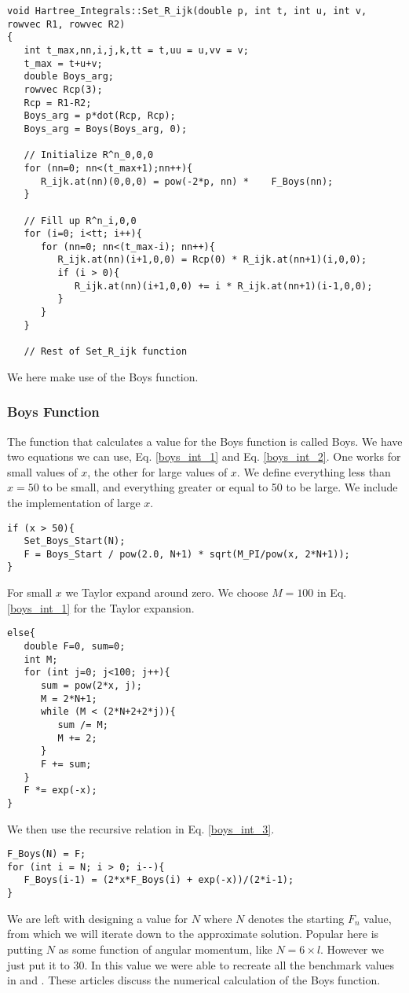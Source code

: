 \documentclass[a4paper,norsk,11pt,twoside]{report}
\begin{document}
\begin{lstlisting}
void Hartree_Integrals::Set_R_ijk(double p, int t, int u, int v, rowvec R1, rowvec R2)
{
   int t_max,nn,i,j,k,tt = t,uu = u,vv = v;
   t_max = t+u+v;
   double Boys_arg;
   rowvec Rcp(3);
   Rcp = R1-R2;
   Boys_arg = p*dot(Rcp, Rcp);
   Boys_arg = Boys(Boys_arg, 0);
   
   // Initialize R^n_0,0,0
   for (nn=0; nn<(t_max+1);nn++){
      R_ijk.at(nn)(0,0,0) = pow(-2*p, nn) *    F_Boys(nn);
   }

   // Fill up R^n_i,0,0
   for (i=0; i<tt; i++){
      for (nn=0; nn<(t_max-i); nn++){
         R_ijk.at(nn)(i+1,0,0) = Rcp(0) * R_ijk.at(nn+1)(i,0,0);
         if (i > 0){
            R_ijk.at(nn)(i+1,0,0) += i * R_ijk.at(nn+1)(i-1,0,0);
         }
      }
   }
   
   // Rest of Set_R_ijk function   
\end{lstlisting}
We here make use of the Boys function.

\subsubsection{Boys Function}
The function that calculates a value for the Boys function is called
Boys. We have two equations we can use, Eq. \eqref{boys_int_1} and
Eq. \eqref{boys_int_2}. One works for small values of $x$, the other for large
values of $x$. We define everything less than $x = 50$ to be small, and everything
greater or equal to 50 to be large. We include the implementation of
large $x$. \\

\begin{lstlisting}
if (x > 50){
   Set_Boys_Start(N);
   F = Boys_Start / pow(2.0, N+1) * sqrt(M_PI/pow(x, 2*N+1));
}
\end{lstlisting}
For small $x$ we Taylor expand around zero. We choose $M = 100$ in Eq. \eqref{boys_int_1} for the Taylor expansion. 

\begin{lstlisting}
else{
   double F=0, sum=0;
   int M;
   for (int j=0; j<100; j++){
      sum = pow(2*x, j);
      M = 2*N+1;
      while (M < (2*N+2+2*j)){
         sum /= M;
         M += 2;
      }
      F += sum;
   }
   F *= exp(-x);
}
\end{lstlisting}
We then use the recursive relation in Eq. \eqref{boys_int_3}. 

\begin{lstlisting}
F_Boys(N) = F;
for (int i = N; i > 0; i--){
   F_Boys(i-1) = (2*x*F_Boys(i) + exp(-x))/(2*i-1);
}
\end{lstlisting}
We are left with designing a value for $N$ where $N$ denotes the
starting $F_n$ value, from which we will iterate down to the
approximate solution. Popular here is putting $N$ as some function of
angular momentum, like $N = 6 \times l$. However we just put it to
30. In this value we were able to recreate all the benchmark values in
\cite{boys_referanse_1} and \cite{boys_referanse_2}. These articles
discuss the numerical calculation of the Boys function.
\end{document}
